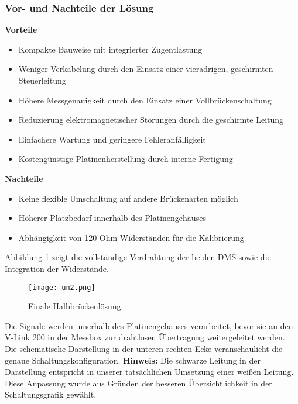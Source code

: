 \subsubsection{Vor- und Nachteile der Lösung}
\textbf{Vorteile}
\begin{itemize}
    \item Kompakte Bauweise mit integrierter Zugentlastung
    \item Weniger Verkabelung durch den Einsatz einer vieradrigen, geschirmten Steuerleitung
    \item Höhere Messgenauigkeit durch den Einsatz einer Vollbrückenschaltung
    \item Reduzierung elektromagnetischer Störungen durch die geschirmte Leitung
    \item Einfachere Wartung und geringere Fehleranfälligkeit
    \item Kostengünstige Platinenherstellung durch interne Fertigung
\end{itemize}

\textbf{Nachteile}
\begin{itemize}
    \item Keine flexible Umschaltung auf andere Brückenarten möglich
    \item Höherer Platzbedarf innerhalb des Platinengehäuses
    \item Abhängigkeit von 120-Ohm-Widerständen für die Kalibrierung
\end{itemize}
Abbildung \ref{fig:un2} zeigt die vollständige Verdrahtung der beiden DMS sowie die Integration der Widerstände.
\begin{figure}[h]
    \begin{center}
        \texttt{[image: un2.png]}
        \caption[Finale Halbbr\"uckenl\"osung (Abbildungsverzeichnis)]{Finale Halbbr\"uckenl\"osung}
        
        \label{fig:un2}
    \end{center}
\end{figure}
Die Signale werden innerhalb des Platinengehäuses verarbeitet, bevor sie an den V-Link 200 in der Messbox zur drahtlosen Übertragung weitergeleitet werden. Die schematische Darstellung in der unteren rechten Ecke veranschaulicht die genaue Schaltungskonfiguration.
\textbf{Hinweis:} Die schwarze Leitung in der Darstellung entspricht in unserer tatsächlichen Umsetzung einer weißen Leitung. Diese Anpassung wurde aus Gründen der besseren Übersichtlichkeit in der Schaltungsgrafik gewählt.




